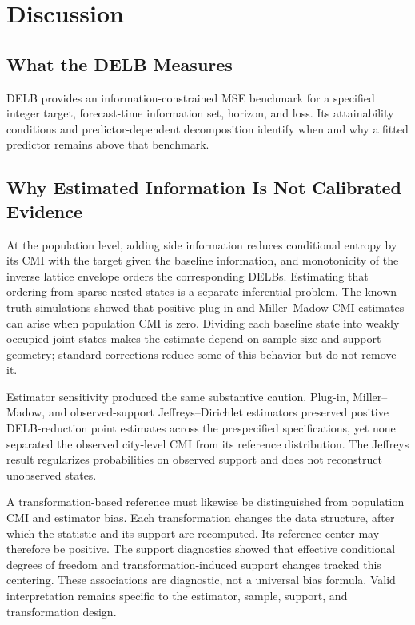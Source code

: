 \documentclass[applsci,article,accept,moreauthors]{Definitions/mdpi}
\begin{document}
\section{Discussion}
\label{sec:discussion}

\subsection{What the DELB Measures}
\label{subsec:discussion_rq1}

{DELB provides an information-constrained MSE benchmark for a specified
integer target, forecast-time information set, horizon, and loss. Its
attainability conditions and predictor-dependent decomposition identify when
and why a fitted predictor remains above that benchmark.}

\subsection{Why Estimated Information Is Not Calibrated Evidence}
\label{subsec:discussion_rq2}

At the population level, adding side information reduces conditional entropy
by its CMI with the target given the baseline information, and monotonicity
of the inverse lattice envelope orders the corresponding DELBs. Estimating
that ordering from sparse nested states is a separate inferential problem.
The known-truth simulations showed that positive plug-in and
Miller--Madow CMI estimates can arise when population CMI is zero. Dividing
each baseline state into weakly occupied joint states makes the estimate
depend on sample size and support geometry; standard corrections reduce some
of this behavior but do not remove it.

Estimator sensitivity produced the same substantive caution. Plug-in,
Miller--Madow, and observed-support Jeffreys--Dirichlet estimators preserved
positive DELB-reduction point estimates across the prespecified
specifications, yet none separated the observed city-level CMI from its
reference distribution. The Jeffreys result regularizes probabilities on
observed support and does not reconstruct unobserved states.

A transformation-based reference must likewise be distinguished from
population CMI and estimator bias. Each transformation changes the data
structure, after which the statistic and its support are recomputed. Its
reference center may therefore be positive. The support diagnostics showed
that effective conditional degrees of freedom and transformation-induced
support changes tracked this centering. These associations are diagnostic,
not a universal bias formula. Valid interpretation remains specific to the
estimator, sample, support, and transformation design.
\end{document}
